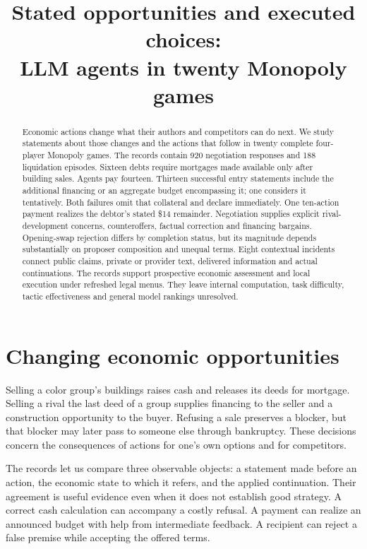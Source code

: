 \documentclass[11pt,letterpaper]{article}
\title{Stated opportunities and executed choices:\\LLM agents in twenty Monopoly games}
\author{}
\date{}
\begin{document}
\maketitle
\begin{abstract}
Economic actions change what their authors and competitors can do next. We study statements about those changes and the actions that follow in twenty complete four-player Monopoly games. The records contain 920 negotiation responses and 188 liquidation episodes. Sixteen debts require mortgages made available only after building sales. Agents pay fourteen. Thirteen successful entry statements include the additional financing or an aggregate budget encompassing it; one considers it tentatively. Both failures omit that collateral and declare immediately. One ten-action payment realizes the debtor's stated \$14 remainder. Negotiation supplies explicit rival-development concerns, counteroffers, factual correction and financing bargains. Opening-swap rejection differs by completion status, but its magnitude depends substantially on proposer composition and unequal terms. Eight contextual incidents connect public claims, private or provider text, delivered information and actual continuations. The records support prospective economic assessment and local execution under refreshed legal menus. They leave internal computation, task difficulty, tactic effectiveness and general model rankings unresolved.
\end{abstract}

\section{Changing economic opportunities}
Selling a color group's buildings raises cash and releases its deeds for mortgage. Selling a rival the last deed of a group supplies financing to the seller and a construction opportunity to the buyer. Refusing a sale preserves a blocker, but that blocker may later pass to someone else through bankruptcy. These decisions concern the consequences of actions for one's own options and for competitors.

The records let us compare three observable objects: a statement made before an action, the economic state to which it refers, and the applied continuation. Their agreement is useful evidence even when it does not establish good strategy. A correct cash calculation can accompany a costly refusal. A payment can realize an announced budget with help from intermediate feedback. A recipient can reject a false premise while accepting the offered terms.
\end{document}
